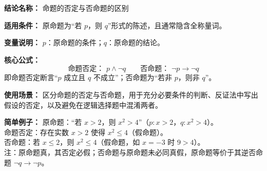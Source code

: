 \textbf{结论名称：} 命题的否定与否命题的区别

\textbf{适用条件：} 原命题为“若 \( p \)，则 \( q \)”形式的陈述，且通常隐含全称量词。

\textbf{变量说明：} \( p \)：原命题的条件；\( q \)：原命题的结论。

\textbf{核心公式：}
\[
\boxed{\text{命题否定： } p \wedge \neg q \qquad \text{否命题： } \neg p \rightarrow \neg q}
\]
即命题否定断言“\( p \) 成立且 \( q \) 不成立”；否命题为“若非 \( p \)，则非 \( q \)”。

\textbf{使用场景：} 区分命题的否定与否命题，用于充分必要条件的判断、反证法中写出假设的否定，以及避免在逻辑选择题中混淆两者。

\textbf{简单例子：} 原命题：“若 \( x>2 \)，则 \( x^{2}>4 \)”（\( p:x>2 \)，\( q:x^{2}>4 \)）。\\
命题否定：存在实数 \( x>2 \) 使得 \( x^{2}\le 4 \)（假命题）。\\
否命题：若 \( x\le 2 \)，则 \( x^{2}\le 4 \)（假命题，如 \( x=-3 \) 时 \( 9>4 \)）。\\
注：原命题真，其否定必假；否命题与原命题未必同真假，原命题等价于其逆否命题 \( \neg q\rightarrow\neg p \)。
